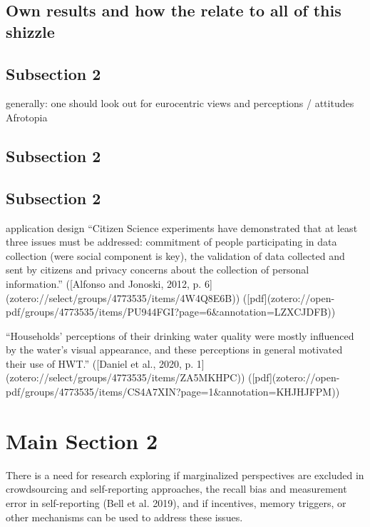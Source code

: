 \subsection{Own results and how the relate to all of this shizzle}


\subsection{Subsection 2}

generally: one should look out for eurocentric views and perceptions / attitudes
Afrotopia

\subsection{Subsection 2}


\subsection{Subsection 2}

application design 
“Citizen Science experiments have demonstrated that at least three issues must be addressed: commitment of people participating in data collection (were social component is key), the validation of data collected and sent by citizens and privacy concerns about the collection of personal information.” ([Alfonso and Jonoski, 2012, p. 6](zotero://select/groups/4773535/items/4W4Q8E6B)) ([pdf](zotero://open-pdf/groups/4773535/items/PU944FGI?page=6\&annotation=LZXCJDFB))

“Households’ perceptions of their drinking water quality were mostly influenced by the water’s visual appearance, and these perceptions in general motivated their use of HWT.” ([Daniel et al., 2020, p. 1](zotero://select/groups/4773535/items/ZA5MKHPC)) ([pdf](zotero://open-pdf/groups/4773535/items/CS4A7XIN?page=1&annotation=KHJHJFPM))



\section{Main Section 2}

There is a need for research exploring if marginalized perspectives are excluded in crowdsourcing and self-reporting approaches, the recall bias and measurement error in self-reporting (Bell et al. 2019), and if incentives, memory triggers, or other mechanisms can be used to address these issues.


